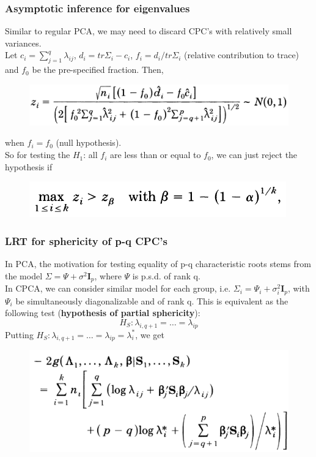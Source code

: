 \documentclass{beamer}
\begin{document}
\begin{frame}
	\frametitle{Asymptotic inference for eigenvalues}
	Similar to regular PCA, we may need to discard CPC's with relatively small variances.\\
	Let $c_i=\sum_{j=1}^{q}\lambda_{ij}$, $d_i = tr\Sigma_i - c_i$, $f_i = d_i/tr\Sigma_i$ (relative contribution to trace) and $f_0$ be the pre-specified fraction. Then,
	\begin{figure}
		\includegraphics[width=.7\linewidth]{image013.png}
	\end{figure}
	when $f_i = f_0$ (null hypothesis).\\
	So for testing the $H_1$: all $f_i$ are less than or equal to $f_0$, we can just reject the hypothesis if 
	\begin{figure}
		\includegraphics[width=.5\linewidth]{image014.png}
	\end{figure}
\end{frame}


\begin{frame}
	\frametitle{LRT for sphericity of p-q CPC's}
	In PCA, the motivation for testing equality of p-q characteristic roots stems from the model $\Sigma = \Psi + \sigma^2\bm{I}_p$, where $\Psi$ is p.s.d. of rank q.\\
	
	In CPCA, we can consider similar model for each group, i.e. $\Sigma_i = \Psi_i + \sigma_i^2\bm{I}_p$, with $\Psi_i$ be simultaneously diagonalizable and of rank q. This is equivalent as the following test (\textbf{hypothesis of partial sphericity}):
	$$H_S: \lambda_{i,q+1}=\ldots=\lambda_{ip}$$
	Putting $H_S: \lambda_{i,q+1}=\ldots=\lambda_{ip} = \lambda_i^*$, we get
	\begin{figure}
		\includegraphics[width=.6\linewidth]{image015.png}
	\end{figure}
\end{frame}
\end{document}

